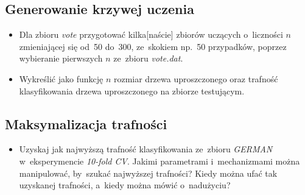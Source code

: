 \subsection{Generowanie krzywej uczenia}

\begin{itemize}
\item Dla zbioru \emph{vote} przygotować kilka[naście] zbiorów uczących o~liczności $n$ zmieniającej się od~50 do~300, ze~skokiem np.~50 przypadków, poprzez wybieranie pierwszych $n$ ze~zbioru \emph{vote.dat}.
\item Wykreślić jako funkcję $n$ rozmiar drzewa uproszczonego oraz trafność klasyfikowania drzewa uproszczonego na zbiorze testującym.

\end{itemize}

\subsection{Maksymalizacja trafności}

\begin{itemize}
\item Uzyskaj jak najwyższą trafność klasyfikowania ze~zbioru \emph{GERMAN} w~eksperymencie \emph{10-fold CV}. Jakimi parametrami i~mechanizmami można manipulować, by~szukać najwyższej trafności? Kiedy można ufać tak uzyskanej trafności, a~kiedy można mówić o~nadużyciu?
\end{itemize}